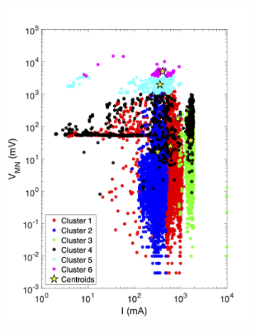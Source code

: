 \documentclass[final,authoryear,5p,times,twocolumn]{elsarticle}
\begin{document}
\begin{figure}[!ht]
   \centering

   \begin{subfigure}[b]{0.475\linewidth}
       \centering
       \includegraphics[trim=0.3cm 0.7cm 1.5cm 1.8cm, clip=true, width=\linewidth]{./Figures/Fig12a.png}
       \caption{}
       \label{fig:AB_Mixed_MN_Cable2_Vmn_vs_I_Cluster}
   \end{subfigure}
   \hfill
   \begin{subfigure}[b]{0.475\linewidth}
       \centering

\end{subfigure}
\end{figure}
\end{document}
